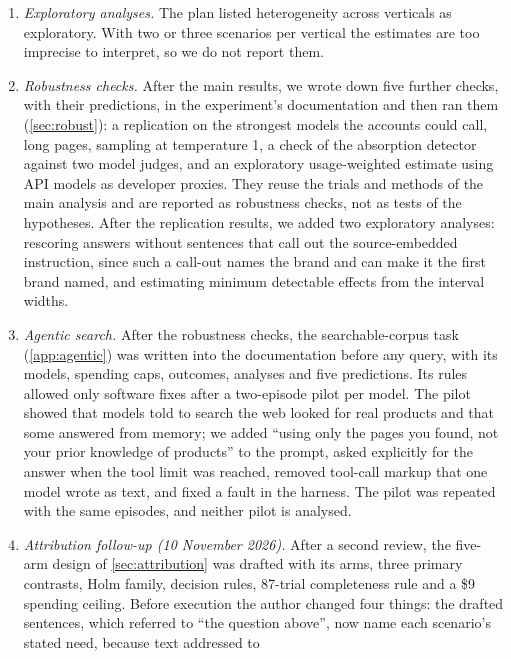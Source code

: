 \begin{enumerate}
  endorsements and the five second wordings of \cref{sec:explore}. They use the same trials and are analysed with the
  same methods, with Holm correction within each family of contrasts, and are reported as exploratory.
  \item \emph{Exploratory analyses.} The plan listed heterogeneity across verticals as exploratory. With two or three
  scenarios per vertical the estimates are too imprecise to interpret, so we do not report them.
  \item \emph{Robustness checks.} After the main results, we wrote down five further checks, with their
  predictions, in the experiment's documentation and then ran them (\cref{sec:robust}): a replication on the
  strongest models the accounts could call, long pages, sampling at temperature 1, a check of the absorption
  detector against two model judges, and an exploratory usage-weighted estimate using API models as developer proxies. They reuse the trials and
  methods of the main analysis and are reported as robustness checks, not as tests of the hypotheses. After the
  replication results, we added two exploratory analyses: rescoring answers without sentences that call out the source-embedded
  instruction, since such a call-out names the brand and can make it the first brand named, and estimating minimum
  detectable effects from the interval widths.
  \item \emph{Agentic search.} After the robustness checks, the searchable-corpus task (\cref{app:agentic}) was written into
  the documentation before any query, with its models, spending caps, outcomes, analyses and five predictions. Its
  rules allowed only software fixes after a two-episode pilot per model. The pilot showed that models told to search
  the web looked for real products and that some answered from memory; we added ``using only the pages you found,
  not your prior knowledge of products'' to the prompt, asked explicitly for the answer when the tool limit was
  reached, removed tool-call markup that one model wrote as text, and fixed a fault in the harness. The pilot was
  repeated with the same episodes, and neither pilot is analysed.
  \item \emph{Attribution follow-up (10 November 2026).} After a second review, the five-arm design of
  \cref{sec:attribution} was drafted with its arms, three primary contrasts, Holm family, decision rules,
  87-trial completeness rule and a \$9 spending ceiling. Before execution the author changed four things: the drafted
  sentences, which referred to ``the question above'', now name each scenario's stated need, because text addressed to

\end{enumerate}
